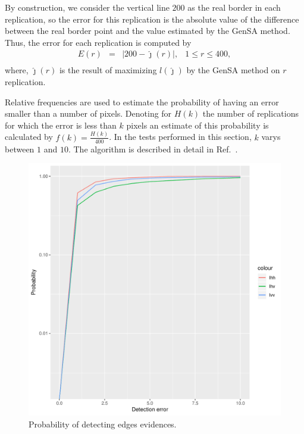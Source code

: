 \documentclass[conference]{IEEEtran}
\begin{document}
     By construction, we consider the vertical line $200$ as the real border in each replication, so the error for this replication is the absolute value of the difference between the real border point and the value estimated by the GenSA method. Thus, the error for each replication is computed by
\begin{equation*}
\begin{array}{llll}
	E(r) &=& |200 - \hat{\jmath}(r)|, & 1\leq r \leq 400,  \\
\end{array}
\end{equation*}
where, $\hat{\jmath}(r)$ is the result of maximizing $l(\widehat\jmath)$ by the GenSA method on $r$ replication.

Relative frequencies are used to estimate the probability of having an error smaller than a number of pixels. Denoting for $H(k)$ the number of replications for which the error is less than $k$ pixels an estimate of this probability is calculated by $f(k)=\frac{H(k)}{400}$. In the tests performed in this section, $k$ varys between $1$ and $10$. The algorithm is described in detail in Ref.~\cite{fbgm}.  
   \begin{figure}[hbt]
\centering
	\includegraphics[scale=0.4]{metricas_ihh_ivh_ivv_nhfc_artigos.pdf}%
	\caption{Probability of detecting edges evidences.}
\label{probability_edge_detc}
\end{figure}
\end{document}
